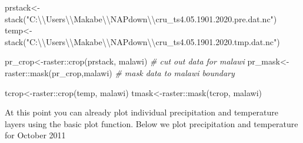 \documentclass[
]{book}
\newenvironment{Shaded}{\begin{snugshade}}{\end{snugshade}}
\newcommand{\AttributeTok}[1]{\textcolor[rgb]{0.77,0.63,0.00}{#1}}
\newcommand{\CommentTok}[1]{\textcolor[rgb]{0.56,0.35,0.01}{\textit{#1}}}
\newcommand{\DecValTok}[1]{\textcolor[rgb]{0.00,0.00,0.81}{#1}}
\newcommand{\FloatTok}[1]{\textcolor[rgb]{0.00,0.00,0.81}{#1}}
\newcommand{\FunctionTok}[1]{\textcolor[rgb]{0.00,0.00,0.00}{#1}}
\newcommand{\NormalTok}[1]{#1}
\newcommand{\OtherTok}[1]{\textcolor[rgb]{0.56,0.35,0.01}{#1}}
\newcommand{\SpecialCharTok}[1]{\textcolor[rgb]{0.00,0.00,0.00}{#1}}
\newcommand{\StringTok}[1]{\textcolor[rgb]{0.31,0.60,0.02}{#1}}
\begin{document}
\begin{Shaded}
\begin{Highlighting}[]
\NormalTok{prstack}\OtherTok{\textless{}{-}}\FunctionTok{stack}\NormalTok{(}\StringTok{"C:}\SpecialCharTok{\textbackslash{}\textbackslash{}}\StringTok{Users}\SpecialCharTok{\textbackslash{}\textbackslash{}}\StringTok{Makabe}\SpecialCharTok{\textbackslash{}\textbackslash{}}\StringTok{NAPdown}\SpecialCharTok{\textbackslash{}\textbackslash{}}\StringTok{cru\_ts4.05.1901.2020.pre.dat.nc"}\NormalTok{)}
\NormalTok{temp}\OtherTok{\textless{}{-}}\FunctionTok{stack}\NormalTok{(}\StringTok{"C:}\SpecialCharTok{\textbackslash{}\textbackslash{}}\StringTok{Users}\SpecialCharTok{\textbackslash{}\textbackslash{}}\StringTok{Makabe}\SpecialCharTok{\textbackslash{}\textbackslash{}}\StringTok{NAPdown}\SpecialCharTok{\textbackslash{}\textbackslash{}}\StringTok{cru\_ts4.05.1901.2020.tmp.dat.nc"}\NormalTok{)}

\NormalTok{pr\_crop}\OtherTok{\textless{}{-}}\NormalTok{raster}\SpecialCharTok{::}\FunctionTok{crop}\NormalTok{(prstack, malawi) }\CommentTok{\# cut out data for malawi}
\NormalTok{pr\_mask}\OtherTok{\textless{}{-}}\NormalTok{raster}\SpecialCharTok{::}\FunctionTok{mask}\NormalTok{(pr\_crop,malawi) }\CommentTok{\# mask data to malawi boundary}

\NormalTok{tcrop}\OtherTok{\textless{}{-}}\NormalTok{raster}\SpecialCharTok{::}\FunctionTok{crop}\NormalTok{(temp, malawi)}
\NormalTok{tmask}\OtherTok{\textless{}{-}}\NormalTok{raster}\SpecialCharTok{::}\FunctionTok{mask}\NormalTok{(tcrop, malawi)}
\end{Highlighting}
\end{Shaded}

At this point you can already plot individual precipitation and temperature layers using the basic plot function. Below we plot precipitation and temperature for October 2011

\begin{Shaded}
\end{Shaded}
\end{document}
